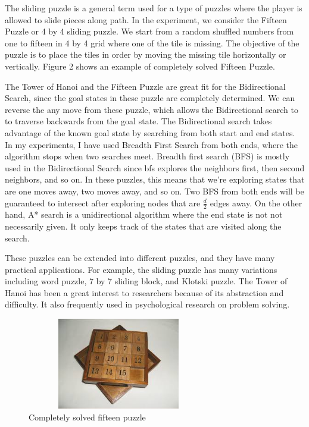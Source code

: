 \documentclass[conference]{IEEEtran}
\begin{document}
The sliding puzzle is a general term used for a type of puzzles where the player is allowed to slide pieces along path. In the experiment, we consider the Fifteen Puzzle or 4 by 4 sliding puzzle. We start from a random shuffled numbers from one to fifteen in 4 by 4 grid where one of the tile is missing. The objective of the puzzle is to place the tiles in order by moving the missing tile horizontally or vertically. Figure 2 shows an example of completely solved Fifteen Puzzle.

The Tower of Hanoi and the Fifteen Puzzle are great fit for the Bidirectional Search, since the goal states in these puzzle are completely determined. We can reverse the any move from these puzzle, which allows the Bidirectional search to to traverse backwards from the goal state. The Bidirectional search takes advantage of the known goal state by searching from both start and end states. In my experiments, I have used Breadth First Search from both ends, where the algorithm stops when two searches meet. Breadth first search (BFS) is mostly used in the Bidirectional Search since bfs explores the neighbors first, then second neighbors, and so on. In these puzzles, this means that we're exploring states that are one moves away, two moves away, and so on. Two BFS from both ends will be guaranteed to intersect after exploring nodes that are $\frac{d}{2}$ edges away. On the other hand, A* search is a unidirectional algorithm where the end state is not not necessarily given. It only keeps track of the states that are visited along the search.

These puzzles can be extended into different puzzles, and they have many practical applications. For example, the sliding puzzle has many variations including word puzzle, 7 by 7 sliding block, and Klotski puzzle. The Tower of Hanoi has been a great interest to researchers because of its abstraction and difficulty. It also frequently used in psychological research on problem solving.

\begin{figure}[!t]
\includegraphics[width=8cm, height=4cm]{slidingpuzzle}
\centering
\caption{Completely solved fifteen puzzle}
\end{figure}
\end{document}
